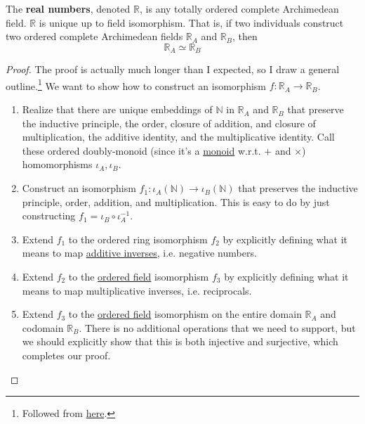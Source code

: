   \begin{theorem}
    \label{thm:axiomatic-definition-of-reals}
    The \textbf{real numbers}, denoted $\mathbb{R}$, is any totally ordered complete Archimedean field. $\mathbb{R}$ is unique up to field isomorphism. That is, if two individuals construct two ordered complete Archimedean fields $\mathbb{R}_A$ and $\mathbb{R}_B$, then 
    \begin{equation}
      \mathbb{R}_A \simeq \mathbb{R}_B
    \end{equation}
  \end{theorem} 
  \begin{proof}
    The proof is actually much longer than I expected, so I draw a general outline.\footnote{Followed from \href{https://math.ucr.edu/~res/math205A/uniqreals.pdf}{here}.} We want to show how to construct an isomorphism $f: \mathbb{R}_A \rightarrow \mathbb{R}_B$. 
    \begin{enumerate}
      \item Realize that there are unique embeddings of $\mathbb{N}$ in $\mathbb{R}_A$ and $\mathbb{R}_B$ that preserve the inductive principle, the order, closure of addition, and closure of multiplication, the additive identity, and the multiplicative identity. Call these ordered doubly-monoid (since it's a \hyperref[alg-def:monoid]{monoid} w.r.t. $+$ and $\times$) homomorphisms $\iota_A, \iota_B$. 
      \item Construct an isomorphism $f_1: \iota_A(\mathbb{N}) \rightarrow \iota_B(\mathbb{N})$ that preserves the inductive principle, order, addition, and multiplication. This is easy to do by just constructing $f_1 = \iota_B \circ \iota_A^{-1}$. 
      \item Extend $f_1$ to the ordered ring isomorphism $f_2$ by explicitly defining what it means to map \hyperref[alg-thm:additive-inverses]{additive inverses}, i.e. negative numbers. 
      \item Extend $f_2$ to the \hyperref[alg-def:ordered-field]{ordered field} isomorphism $f_3$ by explicitly defining what it means to map multiplicative inverses, i.e. reciprocals. 
      \item Extend $f_3$ to the \hyperref[alg-def:ordered-field]{ordered field} isomorphism on the entire domain $\mathbb{R}_A$ and codomain $\mathbb{R}_B$. There is no additional operations that we need to support, but we should explicitly show that this is both injective and surjective, which completes our proof. 
    \end{enumerate}
  \end{proof}

